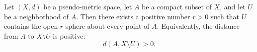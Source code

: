 Let $(X, d)$ be a pseudo-metric space, let $A$ be a compact subset of $X$, and let $U$ be a neighborhood of $A$. Then there exists a positive number $r > 0$ such that $U$ contains the open $r$-sphere about every point of $A$. Equivalently, the distance from $A$ to $X \setminus U$ is positive:
\[
d(A, X \setminus U) > 0.
\]
